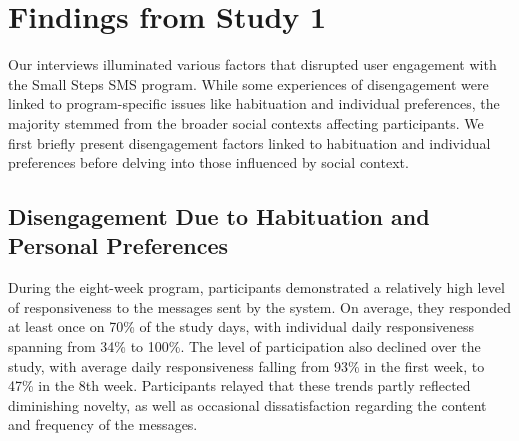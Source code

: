 \section{Findings from Study 1}


Our interviews illuminated various factors that disrupted user engagement with the Small Steps SMS program. While some experiences of disengagement were linked to program-specific issues like habituation and individual preferences, the majority stemmed from the broader social contexts affecting participants. We first briefly present disengagement factors linked to habituation and individual preferences before delving into those influenced by social context.



\subsection{Disengagement Due to Habituation and Personal Preferences}

During the eight-week program, participants demonstrated a relatively high level of responsiveness to the messages sent by the system. On average, they responded at least once on 70\% of the study days, with individual daily responsiveness spanning from 34\% to 100\%. The level of participation also declined over the study, with average daily responsiveness falling from 93\% in the first week, to 47\% in the 8th week. Participants relayed that these trends partly reflected diminishing novelty, as well as occasional dissatisfaction regarding the content and frequency of the messages.

